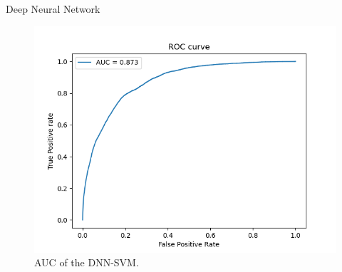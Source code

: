 \documentclass{beamer}
\begin{document}
\begin{frame}{Deep Neural Network}
\begin{varwidth}{0.5\textwidth}
\begin{figure}
    \includegraphics[width=.9\textwidth]{theme/images/roc_curve.png}
    \caption{AUC of the DNN-SVM.}
    \label{fig:dnn_auc}
\end{figure}
\end{varwidth}
\end{frame}
\end{document}
